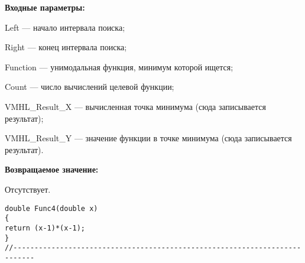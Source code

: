 \textbf{Входные параметры:}

 Left --- начало интервала поиска;
 
Right --- конец интервала поиска;
 
Function --- унимодальная функция, минимум которой ищется;
 
Count --- число вычислений целевой функции;
 
VMHL\_Result\_X --- вычисленная точка минимума (сюда записывается результат);
 
VMHL\_Result\_Y --- значение функции в точке минимума (сюда записывается результат).

\textbf{Возвращаемое значение:}
 
 Отсутствует.

\begin{lstlisting}[caption=Оптимизируемая функция]
double Func4(double x)
{
return (x-1)*(x-1);
}
//---------------------------------------------------------------------------
\end{lstlisting}